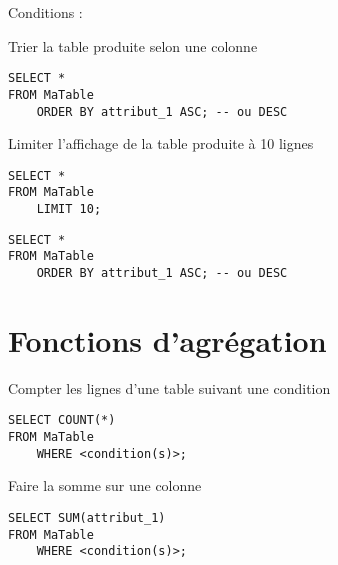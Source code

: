 \documentclass[a4paper,10pt,article]{nsi}
\begin{document}
Conditions : 

Trier la table produite selon une colonne

\begin{sql}
    \begin{verbatim}
SELECT * 
FROM MaTable
    ORDER BY attribut_1 ASC; -- ou DESC
\end{verbatim}
\end{sql}

Limiter l'affichage de la table produite à 10 lignes
\begin{sql}
    \begin{verbatim}
SELECT * 
FROM MaTable
    LIMIT 10;
\end{verbatim}
\end{sql}

\begin{sql}
    \begin{verbatim}
SELECT * 
FROM MaTable
    ORDER BY attribut_1 ASC; -- ou DESC
\end{verbatim}
\end{sql}


\section*{Fonctions d'agrégation}

Compter les lignes d'une table suivant une condition

\begin{sql}
    \begin{verbatim}
SELECT COUNT(*) 
FROM MaTable
    WHERE <condition(s)>;
\end{verbatim}
\end{sql}

Faire la somme sur une colonne
\begin{sql}
    \begin{verbatim}
SELECT SUM(attribut_1) 
FROM MaTable
    WHERE <condition(s)>;
\end{verbatim}
\end{sql}
\end{document}
